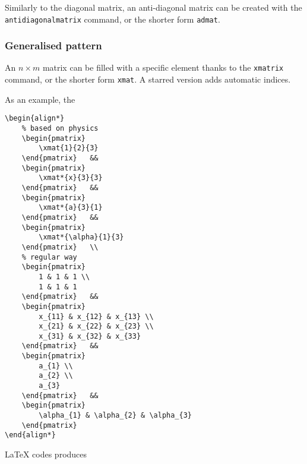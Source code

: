 			
			Similarly to the diagonal matrix, an anti-diagonal matrix can be created with the \texttt{antidiagonalmatrix} command, or the shorter form \texttt{admat}.
		
		
		
		\subsubsection{Generalised pattern}
		
		
			An $n \times m$ matrix can be filled with a specific element thanks to the \texttt{xmatrix} command, or the shorter form \texttt{xmat}.
			A starred version adds automatic indices.
			
			As an example, the
\begin{lstlisting}[language={[LaTeX]TeX}]
\begin{align*}
	% based on physics
	\begin{pmatrix}
		\xmat{1}{2}{3}
	\end{pmatrix}	&&
	\begin{pmatrix}
		\xmat*{x}{3}{3}
	\end{pmatrix}	&&
	\begin{pmatrix}
		\xmat*{a}{3}{1}
	\end{pmatrix}	&&
	\begin{pmatrix}
		\xmat*{\alpha}{1}{3}
	\end{pmatrix}	\\
	% regular way
	\begin{pmatrix}
		1 & 1 & 1 \\
		1 & 1 & 1
	\end{pmatrix}	&&
	\begin{pmatrix}
		x_{11} & x_{12} & x_{13} \\
		x_{21} & x_{22} & x_{23} \\
		x_{31} & x_{32} & x_{33}
	\end{pmatrix}	&&
	\begin{pmatrix}
		a_{1} \\
		a_{2} \\
		a_{3}
	\end{pmatrix}	&&
	\begin{pmatrix}
		\alpha_{1} & \alpha_{2} & \alpha_{3}
	\end{pmatrix}
\end{align*}
\end{lstlisting}
			\LaTeX{} codes produces
